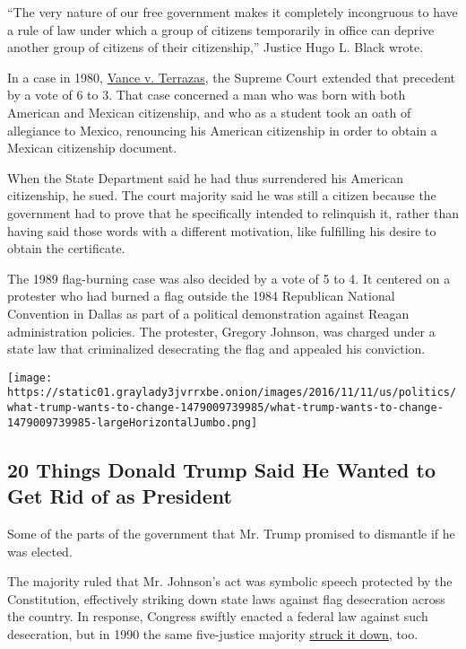 ``The very nature of our free government makes it completely incongruous
to have a rule of law under which a group of citizens temporarily in
office can deprive another group of citizens of their citizenship,''
Justice Hugo L. Black wrote.

In a case in 1980,
\href{https://supreme.justia.com/cases/federalhttps:/supreme.justia.com/cases/federal/us/444/252/case.html/us/444/252/case.html}{Vance
v. Terrazas}, the Supreme Court extended that precedent by a vote of 6
to 3. That case concerned a man who was born with both American and
Mexican citizenship, and who as a student took an oath of allegiance to
Mexico, renouncing his American citizenship in order to obtain a Mexican
citizenship document.

When the State Department said he had thus surrendered his American
citizenship, he sued. The court majority said he was still a citizen
because the government had to prove that he specifically intended to
relinquish it, rather than having said those words with a different
motivation, like fulfilling his desire to obtain the certificate.

The 1989 flag-burning case was also decided by a vote of 5 to 4. It
centered on a protester who had burned a flag outside the 1984
Republican National Convention in Dallas as part of a political
demonstration against Reagan administration policies. The protester,
Gregory Johnson, was charged under a state law that criminalized
desecrating the flag and appealed his conviction.

\href{https://www.nytimes3xbfgragh.onion/interactive/2016/11/11/us/politics/what-trump-wants-to-change.html}{}

\texttt{[image: https://static01.graylady3jvrrxbe.onion/images/2016/11/11/us/politics/what-trump-wants-to-change-1479009739985/what-trump-wants-to-change-1479009739985-largeHorizontalJumbo.png]}

\hypertarget{20-things-donald-trump-said-he-wanted-to-get-rid-of-as-president}{%
\subsection{20 Things Donald Trump Said He Wanted to Get Rid of as
President}\label{20-things-donald-trump-said-he-wanted-to-get-rid-of-as-president}}

Some of the parts of the government that Mr. Trump promised to dismantle
if he was elected.

The majority ruled that Mr. Johnson's act was symbolic speech protected
by the Constitution, effectively striking down state laws against flag
desecration across the country. In response, Congress swiftly enacted a
federal law against such desecration, but in 1990 the same five-justice
majority
\href{https://www.law.cornell.edu/supremecourt/text/496/310}{struck it
down}, too.

